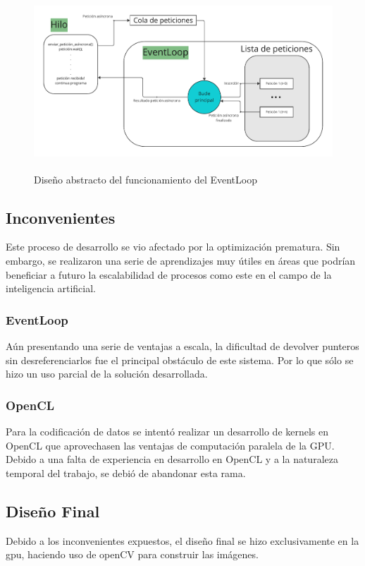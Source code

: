 \begin{figure}[H]
    \centering
    \includegraphics[height=250px]{images/EventLoop.pdf}
    \caption{Diseño abstracto del funcionamiento del EventLoop}
    \label{diagramaEventLoop}
\end{figure}

\subsection{Inconvenientes}
Este proceso de desarrollo se vio afectado por la optimización prematura. Sin embargo, se realizaron una serie de aprendizajes muy útiles en áreas que podrían beneficiar a futuro la escalabilidad de procesos como este en el campo de la inteligencia artificial.
\subsubsection{EventLoop}
Aún presentando una serie de ventajas a escala, la dificultad de devolver punteros sin desreferenciarlos fue el principal obstáculo de este sistema. Por lo que sólo se hizo un uso parcial de la solución desarrollada. 
\subsubsection{OpenCL}
Para la codificación de datos se intentó realizar un desarrollo de kernels en OpenCL que aprovechasen las ventajas de computación paralela de la GPU. Debido a una falta de experiencia en desarrollo en OpenCL y a la naturaleza temporal del trabajo, se debió de abandonar esta rama.

\subsection{Diseño Final}
Debido a los inconvenientes expuestos, el diseño final se hizo exclusivamente en la gpu, haciendo uso de openCV para construir las imágenes.

